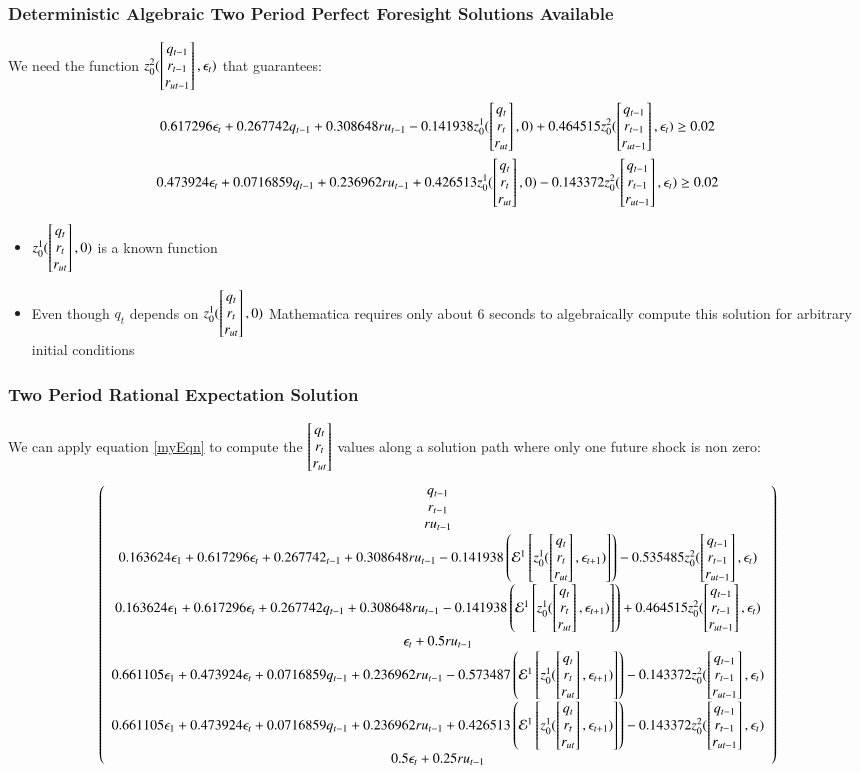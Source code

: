 \documentclass{beamer}
\begin{document}
    \begin{frame}
\frametitle{Deterministic Algebraic Two Period Perfect Foresight Solutions  Available}

We  need the function {\small $z_0^2(\begin{bmatrix} q_{t-1}\\r_{t-1}\\r_{ut-1} \end{bmatrix},\epsilon_t)$ }that guarantees:
{\tiny 
\begin{gather*}
    0.617296 \epsilon_t+0.267742 q_{t-1}+0.308648 ru_{t-1}-0.141938
      z_0^1(\begin{bmatrix} q_t\\r_{t}\\r_{ut} \end{bmatrix},0)+0.464515 z_0^2(\begin{bmatrix} q_{t-1}\\r_{t-1}\\r_{ut-1} \end{bmatrix},\epsilon_t) \ge 0.02\\  
    0.473924 \epsilon_t+0.0716859 q_{t-1}+0.236962 ru_{t-1}+0.426513
      z_0^1(\begin{bmatrix} q_t\\r_{t}\\r_{ut} \end{bmatrix},0)-0.143372 z_0^2(\begin{bmatrix} q_{t-1}\\r_{t-1}\\r_{ut-1} \end{bmatrix},\epsilon_t)  \ge 0.02 \\
\end{gather*}
}
\begin{itemize}
\item {\small $z_0^1(\begin{bmatrix} q_t\\r_{t}\\r_{ut} \end{bmatrix},0)$ } is a known function
\item Even though $q_t$ depends on {\small $z_0^1(\begin{bmatrix} q_t\\r_{t}\\r_{ut} \end{bmatrix},0)$ } Mathematica requires only about 6 seconds to algebraically compute this solution for arbitrary initial conditions
\end{itemize}
    \end{frame}

    \begin{frame}
      \frametitle{Two Period Rational Expectation Solution}
We can apply equation \ref{myEqn} to compute the $\begin{bmatrix} q_t\\r_{t}\\r_{ut} \end{bmatrix}$ values along a solution path where only one future shock is non zero:
{\tiny
      \begin{gather*}
           \left(
   \begin{array}{c}
    q_{t-1} \\
    r_{t-1} \\
    ru_{t-1} \\
  0.163624 \epsilon_{1}+0.617296 \epsilon_t+0.267742 _{t-1}+0.308648 ru_{t-1}-0.141938
      \left ( \mathcal{E}^{1} \left [z_0^1(\begin{bmatrix} q_t\\r_{t}\\r_{ut} \end{bmatrix},\epsilon_{t+1}) \right ]\right )-0.535485 z_0^2(\begin{bmatrix} q_{t-1}\\r_{t-1}\\r_{ut-1} \end{bmatrix},\epsilon_t) \\
    0.163624 \epsilon_{1}+0.617296 \epsilon_t+0.267742 q_{t-1}+0.308648 ru_{t-1}-0.141938
       \left ( \mathcal{E}^{1} \left [z_0^1(\begin{bmatrix} q_t\\r_{t}\\r_{ut} \end{bmatrix},\epsilon_{t+1}) \right ]\right )+0.464515 z_0^2(\begin{bmatrix} q_{t-1}\\r_{t-1}\\r_{ut-1} \end{bmatrix},\epsilon_t) \\
    \epsilon_t+0.5 ru_{t-1} \\
    0.661105 \epsilon_{1}+0.473924 \epsilon_t+0.0716859 q_{t-1}+0.236962 ru_{t-1}-0.573487
       \left ( \mathcal{E}^{1} \left [z_0^1(\begin{bmatrix} q_t\\r_{t}\\r_{ut} \end{bmatrix},\epsilon_{t+1}) \right ]\right ) -0.143372 z_0^2(\begin{bmatrix} q_{t-1}\\r_{t-1}\\r_{ut-1} \end{bmatrix},\epsilon_t) \\
   0.661105 \epsilon_{1}+ 0.473924 \epsilon_t+0.0716859 q_{t-1}+0.236962 ru_{t-1}+0.426513
       \left ( \mathcal{E}^{1} \left [z_0^1(\begin{bmatrix} q_t\\r_{t}\\r_{ut} \end{bmatrix},\epsilon_{t+1}) \right ]\right ) -0.143372 z_0^2(\begin{bmatrix} q_{t-1}\\r_{t-1}\\r_{ut-1} \end{bmatrix},\epsilon_t) \\
    0.5 \epsilon_t+0.25 ru_{t-1} 
   \end{array}
   \right)
      \end{gather*}
}

    \end{frame}
\end{document}
